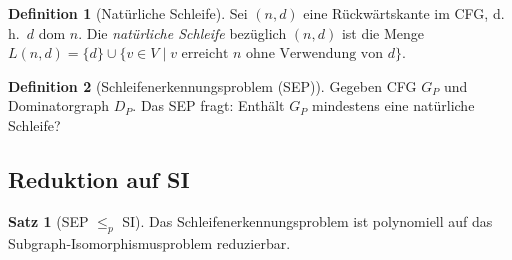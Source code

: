 ﻿\documentclass[a4paper,12pt]{article}
\theoremstyle{definition}
\newtheorem{definition}{Definition}
\newtheorem{satz}{Satz}
\begin{document}
\begin{definition}[Natürliche Schleife]
\label{def:ns}
Sei $(n, d)$ eine Rückwärtskante im CFG, d.\,h.\ $d$ dom $n$. Die \emph{natürliche Schleife} bezüglich $(n, d)$ ist die Menge $L(n,d) = \{d\} \cup \{v \in V \mid v \text{ erreicht } n \text{ ohne Verwendung von } d\}$.
\end{definition}

\begin{definition}[Schleifenerkennungsproblem (SEP)]
\label{def:sep}
Gegeben CFG $G_P$ und Dominatorgraph $D_P$. Das SEP fragt: Enthält $G_P$ mindestens eine natürliche Schleife?
\end{definition}

\subsection{Reduktion auf SI}

\begin{satz}[SEP $\leq_p$ SI]
\label{satz:sep-si}
Das Schleifenerkennungsproblem ist polynomiell auf das Subgraph-Isomorphismusproblem reduzierbar.
\end{satz}
\end{document}
